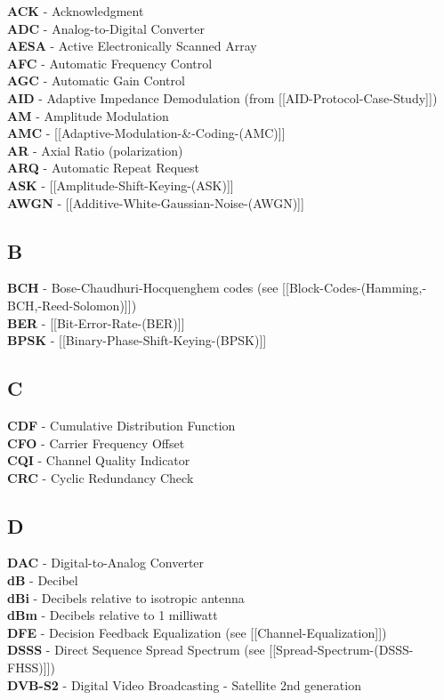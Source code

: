 \textbf{ACK} - Acknowledgment\\
\textbf{ADC} - Analog-to-Digital Converter\\
\textbf{AESA} - Active Electronically Scanned Array\\
\textbf{AFC} - Automatic Frequency Control\\
\textbf{AGC} - Automatic Gain Control\\
\textbf{AID} - Adaptive Impedance Demodulation (from
{[}{[}AID-Protocol-Case-Study{]}{]})\\
\textbf{AM} - Amplitude Modulation\\
\textbf{AMC} - {[}{[}Adaptive-Modulation-\&-Coding-(AMC){]}{]}\\
\textbf{AR} - Axial Ratio (polarization)\\
\textbf{ARQ} - Automatic Repeat Request\\
\textbf{ASK} - {[}{[}Amplitude-Shift-Keying-(ASK){]}{]}\\
\textbf{AWGN} - {[}{[}Additive-White-Gaussian-Noise-(AWGN){]}{]}

\subsection{B}\label{b}

\textbf{BCH} - Bose-Chaudhuri-Hocquenghem codes (see
{[}{[}Block-Codes-(Hamming,-BCH,-Reed-Solomon){]}{]})\\
\textbf{BER} - {[}{[}Bit-Error-Rate-(BER){]}{]}\\
\textbf{BPSK} - {[}{[}Binary-Phase-Shift-Keying-(BPSK){]}{]}

\subsection{C}\label{c}

\textbf{CDF} - Cumulative Distribution Function\\
\textbf{CFO} - Carrier Frequency Offset\\
\textbf{CQI} - Channel Quality Indicator\\
\textbf{CRC} - Cyclic Redundancy Check

\subsection{D}\label{d}

\textbf{DAC} - Digital-to-Analog Converter\\
\textbf{dB} - Decibel\\
\textbf{dBi} - Decibels relative to isotropic antenna\\
\textbf{dBm} - Decibels relative to 1 milliwatt\\
\textbf{DFE} - Decision Feedback Equalization (see
{[}{[}Channel-Equalization{]}{]})\\
\textbf{DSSS} - Direct Sequence Spread Spectrum (see
{[}{[}Spread-Spectrum-(DSSS-FHSS){]}{]})\\
\textbf{DVB-S2} - Digital Video Broadcasting - Satellite 2nd generation

